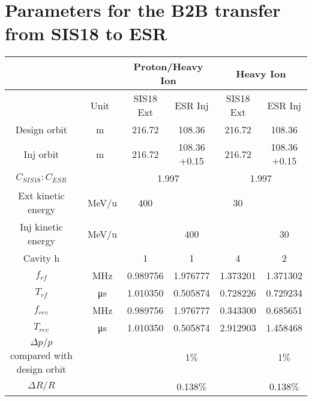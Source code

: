 \newpage
\section{Parameters for the B2B transfer from SIS18 to ESR}



% 
    \begin{longtable}{ | c | c | c | c | c | c |}
    \hline
		\rowcolor[gray]{0.8}
     	 &  & \multicolumn{2}{c|}{Proton/Heavy Ion} & \multicolumn{2}{c|}{Heavy Ion} \\ \hline
		 & Unit &	SIS18 Ext & ESR Inj & SIS18 Ext &	ESR Inj\\ \hline
Design orbit &	m &	 216.72&108.36&	216.72&108.36	\\ \hline
Inj orbit &	m &	 216.72&\tabincell{c}{108.36\\+0.15}&	216.72&\tabincell{c}{108.36\\+0.15}	\\ \hline
$C_{SIS18}:C_{ESR}$&	&	\multicolumn{2}{c|}{1.997}&\multicolumn{2}{c|}{1.997}	\\ \hline
\tabincell{c}{Ext kinetic\\ energy}&	\SI{}{\MeV/\atomicmassunit}&	400 & &30&	\\ \hline
\tabincell{c}{Inj kinetic\\ energy}&	\SI{}{\MeV/\atomicmassunit}&	&400&	&30	\\ \hline
Cavity h&	&1&1&4&2	\\ \hline
$f_{rf}$&\SI{}{\MHz}&	0.989756&1.976777&1.373201&1.371302	\\ \hline$T_{rf}$&\SI{}{\us}&	1.010350&0.505874&0.728226&0.729234\\ \hline
$f_{rev}$&\SI{}{\MHz}&	0.989756&1.976777&0.343300&0.685651\\ \hline
$T_{rev}$&\SI{}{\us}&	1.010350&0.505874&2.912903&1.458468\\ \hline
\tabincell{c}{$\Delta p/p$ compared \\with design orbit}&	&&1$\%$&&1$\%$\\ \hline
$\Delta R/R$&	&&0.138$\%$&&0.138$\%$\\ \hline

\end{longtable}
